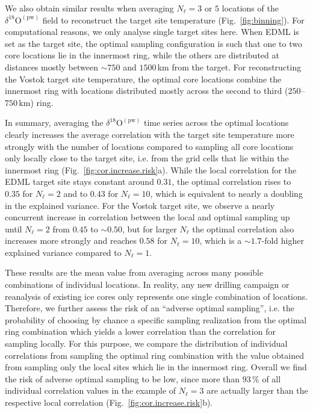 \documentclass[cp]{copernicus}
\begin{document}
We also obtain similar results when averaging $N_{\ell}=3$ or $5$ locations of
the $\delta^{18}\mathrm{O}^{\mathrm{(pw)}}$ field to reconstruct the target site
temperature (Fig.~\ref{fig:binning}). For computational reasons, we only analyse
single target sites here. When EDML is set as the target site, the optimal
sampling configuration is such that one to two core locations lie in the
innermost ring, while the others are distributed at distances mostly between
$\sim750$ and $1500$\,km from the target. For reconstructing the Vostok target
site temperature, the optimal core locations combine the innermost ring with
locations distributed mostly across the second to third ($250$--$750$\,km) ring.

In summary, averaging the $\delta^{18}\mathrm{O}^{\mathrm{(pw)}}$ time series
across the optimal locations clearly increases the average correlation with the
target site temperature more strongly with the number of locations compared to
sampling all core locations only locally close to the target site, i.e. from the
grid cells that lie within the innermost ring
(Fig.~\ref{fig:cor.increase.risk}a). While the local correlation for the EDML
target site stays constant around $0.31$, the optimal correlation rises to
$0.35$ for $N_{\ell}=2$ and to $0.43$ for $N_{\ell}=10$, which is equivalent to
nearly a doubling in the explained variance. For the Vostok target site, we
observe a nearly concurrent increase in correlation between the local and
optimal sampling up until $N_{\ell}=2$ from $0.45$ to $\sim0.50$, but for larger
$N_{\ell}$ the optimal correlation also increases more strongly and reaches
$0.58$ for $N_{\ell}=10$, which is a $\sim1.7$-fold higher explained variance
compared to $N_{\ell}=1$.

These results are the mean value from averaging across many possible
combinations of individual locations. In reality, any new drilling campaign or
reanalysis of existing ice cores only represents one single combination of
locations. Therefore, we further assess the risk of an ``adverse optimal
sampling'', i.e. the probability of choosing by chance a specific sampling
realization from the optimal ring combination which yields a lower correlation
than the correlation for sampling locally. For this purpose, we compare the
distribution of individual correlations from sampling the optimal ring
combination with the value obtained from sampling only the local sites which lie
in the innermost ring. Overall we find the risk of adverse optimal sampling to
be low, since more than $93\,\%$ of all individual correlation values in the
example of $N_{\ell}=3$ are actually larger than the respective local
correlation (Fig.~\ref{fig:cor.increase.risk}b).
\end{document}
